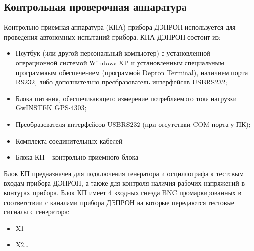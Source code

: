 


\subsection{Контрольная проверочная аппаратура}

Контрольно приемная аппаратура (КПА) прибора ДЭПРОН используется для  проведения автономных испытаний прибора. КПА ДЭПРОН состоит из:


\begin{itemize}
	\item 	Ноутбук (или другой персональный компьютер) с установленной операционной системой Windows XP и установленным специальным программным обеспечением (программой Depron Terminal), наличием порта RS232, либо дополнительно преобразователь интерфейсов USBRS232;
	
	
	\item 	Блока питания, обеспечивающего измерение потребляемого тока нагрузки GwINSTEK GPS-4303;
	
	
	\item 	Преобразователя интерфейсов USBRS232 (при отсутствии COM порта у ПК);
	
	
	\item 	Комплекта соединительных кабелей 
	
	
	\item 	Блока КП -- контрольно-приемного блока
	
	
\end{itemize}








Блок КП предназначен для подключения генератора и осциллографа к тестовым входам прибора ДЭПРОН, а также для контроля наличия рабочих напряжений в контурах прибора. Блок КП имеет 4 входных гнезда BNC промаркированных в соответствии с каналами прибора ДЭПРОН на которые передаются тестовые сигналы с генератора: 



\begin{itemize}
	
	\item 	X1	
	
	\item 	X2\ldots
		
\end{itemize}

